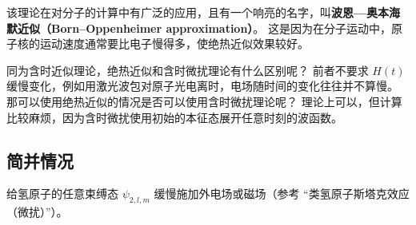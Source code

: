 该理论在对分子的计算中有广泛的应用，且有一个响亮的名字，叫\textbf{波恩—奥本海默近似（Born–Oppenheimer approximation）}。 这是因为在分子运动中，原子核的运动速度通常要比电子慢得多，使绝热近似效果较好。

同为含时近似理论，绝热近似和含时微扰理论有什么区别呢？ 前者不要求 $H(t)$ 缓慢变化，例如用激光波包对原子光电离时，电场随时间的变化往往并不算慢。 那可以使用绝热近似的情况是否可以使用含时微扰理论呢？ 理论上可以，但计算比较麻烦，因为含时微扰使用初始的本征态展开任意时刻的波函数。

\subsection{简并情况}

\begin{example}{}
给氢原子的任意束缚态 $\psi_{2,l,m}$ 缓慢施加外电场或磁场（参考 “类氢原子斯塔克效应（微扰）”）。
\end{example}

